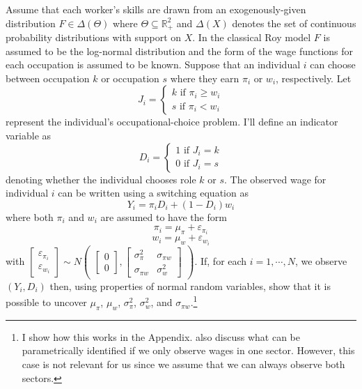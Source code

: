 \documentclass[12 pt]{article}
\begin{document}
Assume that each worker's skills are drawn from an exogenously-given distribution $F\in \Delta(\Theta)$ where $\Theta \subseteq \mathbb{R}_+^2$ and $\Delta(X)$ denotes the set of continuous probability distributions with support on $X$. In the classical Roy model $F$ is assumed to be the log-normal distribution and the form of the wage functions for each occupation is assumed to be known. Suppose that an individual $i$ can choose between occupation $k$ or occupation $s$ where they earn $\pi_i$ or $w_i$, respectively. Let 
\begin{equation}
	J_i =
	\begin{cases}
		k \text{ if } \pi_i \geq w_i\\
		s \text{ if } \pi_i < w_i
	\end{cases}
	\label{eqn:occ_choice}
\end{equation}
represent the individual's occupational-choice problem. I'll define an indicator variable as 
\begin{equation*}
	D_i =
	\begin{cases}
		1 \text{ if } J_i=k\\
		0 \text{ if } J_i=s
	\end{cases}
\end{equation*}
denoting whether the individual chooses role $k$ or $s$. The observed wage for individual $i$ can be written using a switching equation as
\begin{equation*}
	Y_i = \pi_i D_i + (1-D_i) w_i
\end{equation*}
where both $\pi_i$ and $w_i$ are assumed to have the form
\begin{equation}
	\pi_i = \mu_\pi + \varepsilon_{\pi_i}
	\label{eqn:pi_simple}
\end{equation}
\begin{equation}
	w_i = \mu_w + \varepsilon_{w_i}
	\label{eqn:w_simple}
\end{equation}
with $\begin{bmatrix}
	\varepsilon_{\pi_i}\\
	 \varepsilon_{w_i}
\end{bmatrix} \sim N \begin{pmatrix}
\begin{bmatrix}
0\\
0
\end{bmatrix},
\begin{bmatrix}
	\sigma_\pi^2 & \sigma_{\pi w}\\
	\sigma_{\pi w} & \sigma_w^2 
\end{bmatrix}
\end{pmatrix}$. If, for each $i=1,\cdots, N$, we observe $(Y_i,D_i)$ then, using properties of normal random variables, \citet{heckman1990empirical} show that it is possible to uncover $\mu_\pi$, $\mu_w$, $\sigma_\pi^2$, $\sigma_w^2$, and $\sigma_{\pi w}$.\footnote{I show how this works in the Appendix. \citet{heckman1990empirical} also discuss what can be parametrically identified if we only observe wages in one sector. However, this case is not relevant for us since we assume that we can always observe both sectors.}
\end{document}
